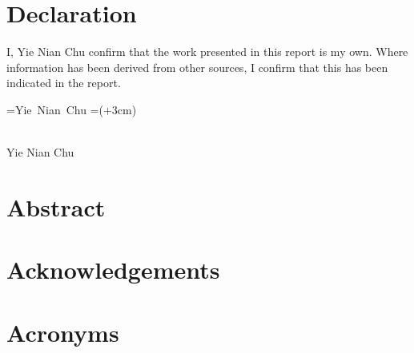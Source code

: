 \documentclass[12pt]{report}
\def\signature#1{%
    \setbox\namebox=\hbox{#1}
    \signboxdim=\dimexpr(\wd\namebox+3cm)
    \parbox[t]{\signboxdim}{%
        \centering
            \hrulefill\\    %
            #1
        \par}%
    }
\numberwithin{figure}{chapter}
\begin{document}
\newpage
\chapter*{Declaration} %
I, Yie Nian Chu confirm that the work presented in this report is my own. Where information has been derived from other sources, I confirm that this has been indicated in the report.
\vspace*{3cm}

\noindent\signature{Yie Nian Chu}
\newpage
\newpage
\chapter*{Abstract} %


\newpage
\chapter*{Acknowledgements}

\newpage
\newpage
\chapter*{Acronyms}
\printglossary[type=\acronymtype,nonumberlist,nopostdot]
\newpage
\tableofcontents 



\newpage 
\listoffigures%


\newpage
\listoftables
{}
\end{document}

